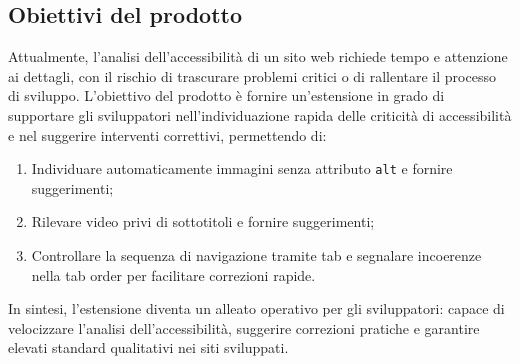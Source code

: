 \subsection{Obiettivi del prodotto}
Attualmente, l'analisi dell'accessibilità di un sito web richiede tempo e attenzione ai dettagli, con il rischio di trascurare problemi critici o di rallentare il processo di sviluppo.
L'obiettivo del prodotto è fornire un'estensione in grado di supportare gli sviluppatori nell'individuazione rapida delle criticità di accessibilità e nel suggerire interventi correttivi, permettendo di:
\begin{enumerate}
\item Individuare automaticamente immagini senza attributo \texttt{alt} e fornire suggerimenti;
\item Rilevare video privi di sottotitoli e fornire suggerimenti;
\item Controllare la sequenza di navigazione tramite tab e segnalare incoerenze nella tab order per facilitare correzioni rapide.
\end{enumerate}

In sintesi, l'estensione diventa un alleato operativo per gli sviluppatori: capace di velocizzare l'analisi dell'accessibilità, suggerire correzioni pratiche e garantire elevati standard qualitativi nei siti sviluppati.
